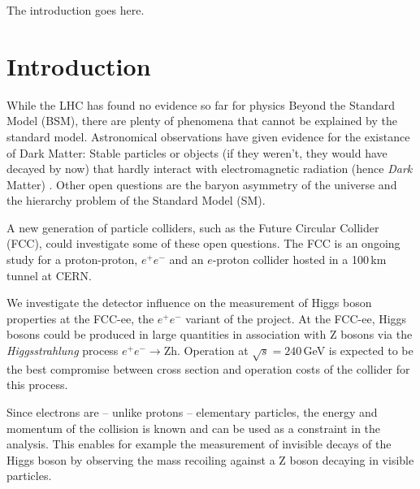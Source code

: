 The introduction goes here.

\section{Introduction}
While the LHC has found no evidence so far for physics Beyond the Standard Model (BSM), there are plenty of phenomena that cannot be explained by the standard model. Astronomical observations have given evidence for the existance of Dark Matter: Stable particles or objects (if they weren't, they would have decayed by now) that hardly interact with electromagnetic radiation (hence \emph{Dark} Matter) \cite{pdg14}. 
Other open questions are the baryon asymmetry of the universe and the hierarchy problem of the Standard Model (SM).

A new generation of particle colliders, such as the Future Circular Collider (FCC), could investigate some of these open questions. The FCC is an ongoing study for a proton-proton, $e^+ e^-$ and an $e$-proton collider hosted in a 100\,km tunnel at CERN.

We investigate the detector influence on the measurement of Higgs boson properties at the FCC-ee, the $e^+ e^-$ variant of the project.
At the FCC-ee, Higgs bosons could be produced in large quantities in association with Z bosons via the \emph{Higgsstrahlung} process $e^+ e^- \rightarrow \mathrm{Zh}$. Operation at $\sqrt{s} = 240$\,GeV is expected to be the best compromise between cross section and operation costs of the collider for this process.

Since electrons are -- unlike protons -- elementary particles, the energy and momentum of the collision is known and can be used as a constraint in the analysis. This enables for example the measurement of invisible decays of the Higgs boson by observing the mass recoiling against a Z boson decaying in visible particles.